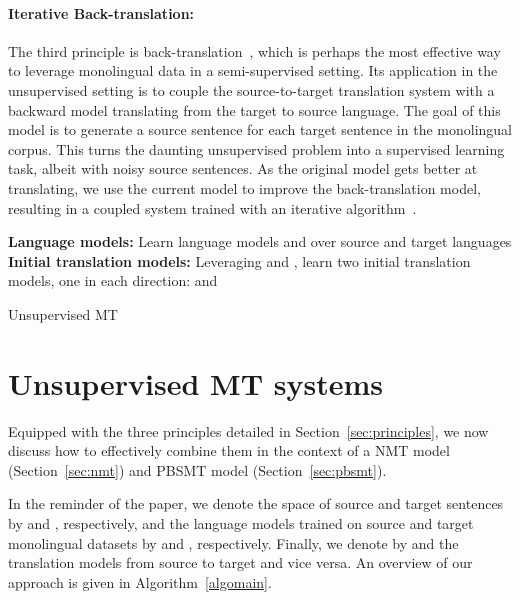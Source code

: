 \documentclass[11pt,a4paper]{article}
\begin{document}
\paragraph{Iterative Back-translation: } The third principle is back-translation~\cite{sennrich2015improving}, which is perhaps the most effective way to leverage monolingual data in a semi-supervised setting. Its application in the unsupervised setting is to couple the source-to-target translation system with a backward model translating from the target to source language. The goal of this model is to generate a source sentence for each target sentence in the monolingual corpus. This turns the daunting unsupervised problem  into a supervised learning task, albeit with noisy source sentences. As the original model gets better at translating, we use the current model to improve the back-translation model, resulting in a coupled system trained with an iterative algorithm~\cite{he2016dual}.

\begin{algorithm}[tb]
{\footnotesize
    \SetAlgoLined
    \textbf{Language models: }Learn language models  and  over source and target languages\;
    \textbf{Initial translation models: }Leveraging  and , learn two initial translation models, one in each direction:  and \;
    }
    \caption{Unsupervised MT \label{algomain}}
\end{algorithm}

\section{Unsupervised MT systems}
\label{sec:models}

Equipped with the three principles detailed in Section~\ref{sec:principles}, we now discuss how to effectively combine them in the context of a NMT model (Section~\ref{sec:nmt}) and PBSMT model (Section~\ref{sec:pbsmt}).

In the reminder of the paper, we denote the space of source and target sentences by  and , respectively, and the language models trained on source and target monolingual datasets by  and , respectively. Finally, we denote by  and  the translation models from source to target and vice versa. 
An overview of our approach is given in Algorithm~\ref{algomain}.
\end{document}
